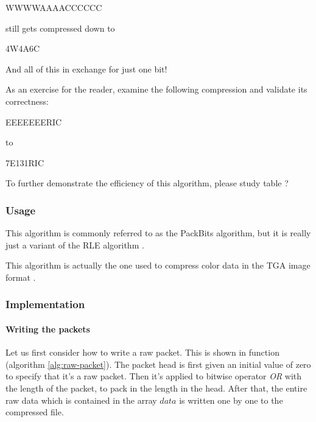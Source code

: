 \begin{refsection}
\begin{indentpar}
  WWWWAAAACCCCCC
\end{indentpar}

still gets compressed down to

\begin{indentpar}
  4W4A6C
\end{indentpar}

And all of this in exchange for just one bit!

As an exercise for the reader, examine the following compression and
validate its correctness:

\begin{indentpar}
  EEEEEEERIC
\end{indentpar}

to

\begin{indentpar}
  7E131RIC
\end{indentpar}

To further demonstrate the efficiency of this algorithm, please study table ?

\subsubsection{Usage}
\label{sec:usage}

This algorithm is commonly referred to as the PackBits algorithm, but
it is really just a variant of the RLE algorithm \cite{96:_techn_note_tn102}.

This algorithm is actually the one used to compress color data in the
TGA image format \cite{91:_truev_tga_file_format_specif}.

\subsubsection{Implementation}
\label{sec:packbits-implementation}

\paragraph{Writing the packets}
\label{sec:writing-packets}

Let us first consider how to write a raw packet. This is shown in
function (algorithm
\ref{alg:raw-packet}). The packet head is first given an initial value
of zero to specify that it's a raw packet. Then it's applied to
bitwise operator \textit{OR} with the length of the packet, to pack in
the length in the head. After that, the entire raw data which is
contained in the array $data$ is written one by one to the compressed file.


\end{refsection}
